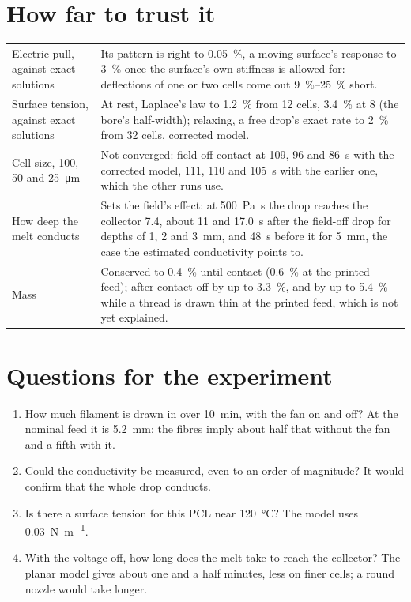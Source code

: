 \documentclass[10pt,a4paper]{article}
\begin{document}
\section{How far to trust it}\label{sec:trust}

\begin{tabularx}{\textwidth}{@{}>{\raggedright\arraybackslash\sffamily\small}p{4.3cm}L@{}}
\toprule
Electric pull, against exact solutions &
  Its pattern is right to \qty{0.05}{\percent}, a moving surface's response to \qty{3}{\percent} once the
  surface's own stiffness is allowed for: deflections of one or two cells come out
  \qtyrange{9}{25}{\percent} short. \\
Surface tension, against exact solutions &
  At rest, Laplace's law to \qty{1.2}{\percent} from 12 cells, \qty{3.4}{\percent} at 8 (the bore's
  half-width); relaxing, a free drop's exact rate to \qty{2}{\percent} from 32 cells, corrected model. \\
Cell size, 100, 50 and \qty{25}{\micro\metre} &
  Not converged: field-off contact at 109, 96 and \qty{86}{\second} with the corrected model, 111, 110 and
  \qty{105}{\second} with the earlier one, which the other runs use. \\
How deep the melt conducts &
  Sets the field's effect: at \qty{500}{\pascal\second} the drop reaches the collector 7.4, about 11 and
  \qty{17.0}{\second} after the field-off drop for depths of 1, 2 and \qty{3}{\milli\metre}, and
  \qty{48}{\second} before it for \qty{5}{\milli\metre}, the case the estimated conductivity points to. \\
Mass &
  Conserved to \qty{0.4}{\percent} until contact (\qty{0.6}{\percent} at the printed feed); after contact
  off by up to \qty{3.3}{\percent}, and by up to \qty{5.4}{\percent} while a thread is drawn thin at the
  printed feed, which is not yet explained. \\
\bottomrule
\end{tabularx}

\section{Questions for the experiment}
\begin{enumerate}
  \item How much filament is drawn in over \qty{10}{\minute}, with the fan on and off? At the nominal feed it
    is \qty{5.2}{\milli\metre}; the fibres imply about half that without the fan and a fifth with it.
  \item Could the conductivity be measured, even to an order of magnitude? It would confirm that the whole
    drop conducts.
  \item Is there a surface tension for this PCL near \qty{120}{\celsius}? The model uses
    \qty{0.03}{\newton\per\metre}.
  \item With the voltage off, how long does the melt take to reach the collector? The planar model gives
    about one and a half minutes, less on finer cells; a round nozzle would take longer.
\end{enumerate}
\end{document}
